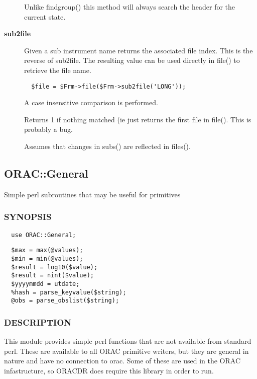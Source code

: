 \begin{description}
Unlike findgroup() this method will always search the header for
the current state.

\item[\textbf{sub2file}] \mbox{}

Given a sub instrument name returns the associated file
index. This is the reverse of sub2file. The resulting value
can be used directly in file() to retrieve the file name.

\begin{verbatim}
  $file = $Frm->file($Frm->sub2file('LONG'));
\end{verbatim}


A case insensitive comparison is performed.



Returns 1 if nothing matched (ie just returns the first file
in file(). This is probably a bug.



Assumes that changes in subs() are reflected in files().

\end{description}


\subsection{ORAC::General\label{ORAC::General}}

Simple perl subroutines that may be useful for primitives

\subsubsection*{SYNOPSIS\label{ORAC::General_SYNOPSIS}}\begin{verbatim}
  use ORAC::General;
\end{verbatim}
\begin{verbatim}
  $max = max(@values);
  $min = min(@values);
  $result = log10($value);
  $result = nint($value);
  $yyyymmdd = utdate;
  %hash = parse_keyvalue($string);
  @obs = parse_obslist($string);
\end{verbatim}
\subsubsection*{DESCRIPTION\label{ORAC::General_DESCRIPTION}}

This module provides simple perl functions that are not available
from standard perl. These are available to all ORAC primitive writers,
but they are general in nature and have no connection to orac. Some of
these are used in the ORAC infastructure, so ORACDR does require this
library in order to run.

